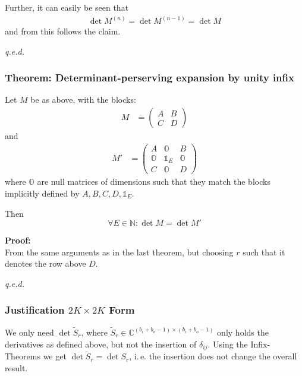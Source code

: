 \documentclass[
	english,
	a4paper,
	fontsize=10pt,
	parskip=half,
	titlepage=true,
	DIV=12,
	final
]{scrreprt}
\newcommand*{\ie}{i.\,e.\xspace}
\newcommand*{\setNaturals} {\ensuremath{\mathbb{N}}}
\newcommand*{\setComplex}  {\ensuremath{\mathbb{C}}}
\begin{document}
Further, it can easily be seen that
\begin{align}
	\det M^{(n)} = \det M^{(n-1)} = \det M
\end{align}
and from this follows the claim.
\begin{flushright}
	\emph{q.e.d.}
\end{flushright}

\subsubsection{Theorem: Determinant-perserving expansion by unity infix}
Let $M$ be as above, with the blocks:
\begin{align}
	M
&=
	\begin{pmatrix}
		A & B \\ C & D
	\end{pmatrix}
\end{align}
and
\begin{align}
	M'
&=
	\begin{pmatrix}
		A & \mathds{O} & B \\
		\mathds{O} & \mathds{1}_{E} & \mathds{O} \\
		C & \mathds{O} & D
	\end{pmatrix}
\end{align}
where $\mathds{O}$ are null matrices of dimensions such that they match the blocks implicitly defined by $A, B, C, D, \mathds{1}_{E}$.

Then
\[ \forall E \in \setNaturals : \det M = \det M' \]

\textbf{Proof:}\\
From the same arguments as in the last theorem, but choosing $r$ such that it denotes the row above $D$.
\begin{flushright}
	\emph{q.e.d.}
\end{flushright}

\subsubsection{Justification $2K \times 2K$ Form}
We only need $\det \tilde{S}_r$, where $\tilde{S}_r \in \setComplex^{(b_i + b_o -1) \times (b_i + b_o -1)}$ only holds the derivatives as defined above, but not the insertion of $\delta_{ij}$. Using the Infix-Theorems we get $\det \tilde{S}_r = \det S_r$, \ie the insertion does not change the overall result.
\end{document}
